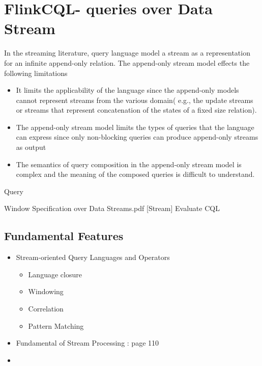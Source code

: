 
\chapter{FlinkCQL- queries over Data Stream}

\ifpdf
    \graphicspath{{Chapter4/Figs/Raster/}{Chapter4/Figs/PDF/}{Chapter4/Figs/}}
\else
    \graphicspath{{Chapter4/Figs/Vector/}{Chapter4/Figs/}}
\fi

In the streaming literature, query language model a stream as a representation for an infinite append-only relation. The append-only stream model effects the following limitations\citep{Ghanem:2008}
\begin{itemize}
\item It limits the applicability of the language since the append-only models cannot represent streams from the various domain( e.g., the update streams or streams that represent concatenation of the states of a fixed size relation).
\item The append-only stream model limits the types of queries that the language can express since only non-blocking queries can produce append-only streams as output
\item The semantics of query composition in the append-only stream model is complex and the meaning of the composed queries is difficult to understand.
\end{itemize}

Query \citep{Babcock:2002} 

Window Specification over Data Streams.pdf
[Stream] Evaluate CQL


\section{Fundamental Features}

\begin{itemize}
\item Stream-oriented Query Languages and Operators
	\begin{itemize}
		\item Language closure
		\item Windowing
		\item Correlation
		\item Pattern Matching
	\end{itemize}
	
\item Fundamental of Stream Processing : page 110
\item 
\end{itemize}



